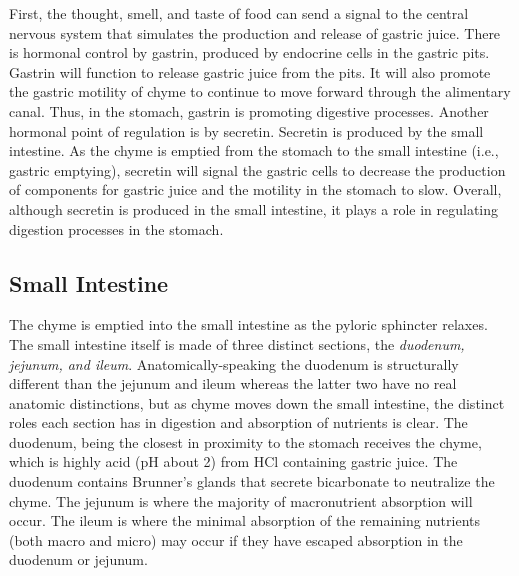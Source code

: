 \documentclass{tufte-handout}
\begin{document}
 First, the thought, smell, and taste of food can send a signal to the central nervous system that simulates the production and release of gastric juice. There is hormonal control by gastrin, produced by endocrine cells in the gastric pits. Gastrin will function to release gastric juice from the pits. It will also promote the gastric motility of chyme to continue to move forward through the alimentary canal. Thus, in the stomach, gastrin is promoting digestive processes. Another hormonal point of regulation is by secretin. Secretin is produced by the small intestine. As the chyme is emptied from the stomach to the small intestine (i.e., gastric emptying), secretin will signal the gastric cells to decrease the production of components for gastric juice and the motility in the stomach to slow. Overall, although secretin is produced in the small intestine, it plays a role in regulating digestion processes in the stomach.\ 

\subsection{Small Intestine}
The chyme is emptied into the small intestine as the pyloric sphincter relaxes. The small intestine itself is made of three distinct sections, the \emph{duodenum, jejunum, and ileum}. Anatomically-speaking the duodenum is structurally different than the jejunum and ileum whereas the latter two  have no real anatomic distinctions, but as chyme moves down the small intestine, the distinct roles each section has in digestion and absorption of nutrients is clear. The duodenum, being the closest in proximity to the stomach receives the chyme, which is highly acid (pH about 2) from HCl containing gastric juice. The duodenum contains Brunner's glands that secrete bicarbonate to neutralize the chyme. The jejunum is where the majority of macronutrient absorption will occur. The ileum is where the minimal absorption of the remaining nutrients (both macro and micro) may occur if they have escaped absorption in the duodenum or jejunum. 
\end{document}
